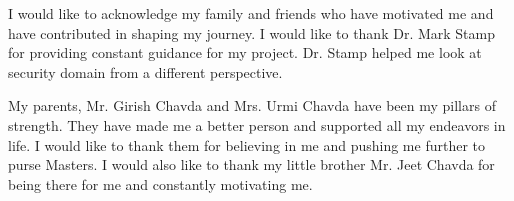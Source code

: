 \par I would like to acknowledge my family and friends who have motivated me and have contributed in shaping my journey. I would like to thank Dr. Mark Stamp for providing constant guidance for my project. Dr. Stamp helped me look at security domain from a different perspective. 

\par My parents, Mr. Girish Chavda and Mrs. Urmi Chavda have been my pillars of strength. They have made me a better person and supported all my endeavors in life. I would like to thank them for believing in me and pushing me further to purse Master\textquotesingle s. I would also like to thank my little brother Mr. Jeet Chavda for being there for me and constantly motivating me. 
